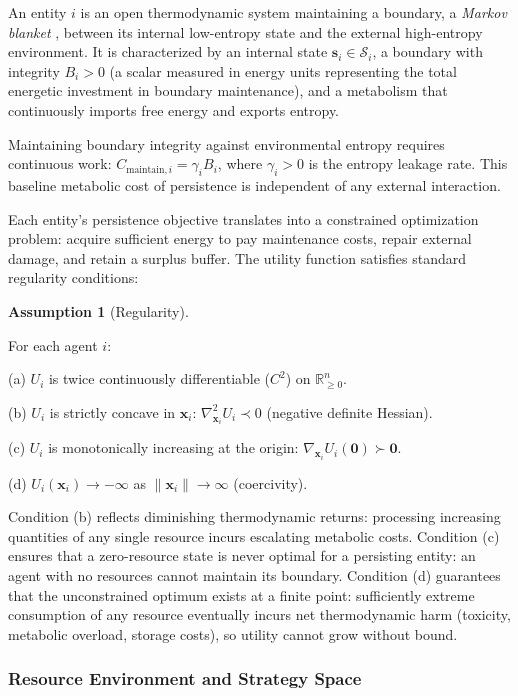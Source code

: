 \documentclass[11pt]{article}
\theoremstyle{plain}
\theoremstyle{definition}
\newtheorem{assumption}[definition]{Assumption}
\theoremstyle{remark}
\let\origsubsubsection\subsubsection
\renewcommand{\subsubsection}{\needspace{4\baselineskip}\origsubsubsection}
\begin{document}
An entity \(i\) is an open thermodynamic system maintaining a boundary,
a \emph{Markov blanket} \citep{Pearl2000, Friston2013}, between its
internal low-entropy state and the external high-entropy environment. It
is characterized by an internal state
\(\mathbf{s}_i \in \mathcal{S}_i\), a boundary with integrity
\(B_i > 0\) (a scalar measured in energy units representing the total
energetic investment in boundary maintenance), and a metabolism that
continuously imports free energy and exports entropy.

Maintaining boundary integrity against environmental entropy requires
continuous work: \(C_{\text{maintain},i} = \gamma_i B_i\), where
\(\gamma_i > 0\) is the entropy leakage rate. This baseline metabolic
cost of persistence is independent of any external interaction.

Each entity's persistence objective translates into a constrained
optimization problem: acquire sufficient energy to pay maintenance
costs, repair external damage, and retain a surplus buffer. The utility
function satisfies standard regularity conditions:

\begin{assumption}[Regularity]
\label{asm-regularity}

For each agent $i$:

(a) $U_i$ is twice continuously differentiable ($C^2$) on $\mathbb{R}_{\geq 0}^n$.

(b) $U_i$ is strictly concave in $\mathbf{x}_i$: $\nabla^2_{\mathbf{x}_i} U_i \prec 0$ (negative definite Hessian).

(c) $U_i$ is monotonically increasing at the origin: $\nabla_{\mathbf{x}_i} U_i(\mathbf{0}) \succ \mathbf{0}$.

(d) $U_i(\mathbf{x}_i) \to -\infty$ as $\|\mathbf{x}_i\| \to \infty$ (coercivity).

Condition (b) reflects diminishing thermodynamic returns: processing increasing quantities of any single resource incurs escalating metabolic costs. Condition (c) ensures that a zero-resource state is never optimal for a persisting entity: an agent with no resources cannot maintain its boundary. Condition (d) guarantees that the unconstrained optimum exists at a finite point: sufficiently extreme consumption of any resource eventually incurs net thermodynamic harm (toxicity, metabolic overload, storage costs), so utility cannot grow without bound.
\end{assumption}

\subsubsection{Resource Environment and Strategy
Space}\label{resource-environment-and-strategy-space}
\end{document}
